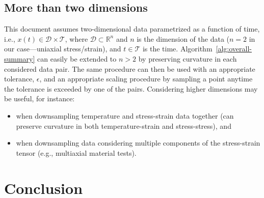 \documentclass[a4paper,11pt]{article}
\begin{document}
\subsection{More than two dimensions}

This document assumes two-dimensional data parametrized as a function of time, i.e., $x(t) \in \mathcal{D} \times \mathcal{T}$, where $\mathcal{D} \subset \mathbb{R}^n$ and $n$ is the dimension of the data ($n = 2$ in our case---uniaxial stress/strain), and $t \in \mathcal{T}$ is the time.
Algorithm~\ref{alg:overall-summary} can easily be extended to $n > 2$ by preserving curvature in each considered data pair.
The same procedure can then be used with an appropriate tolerance, $\epsilon$, and an appropriate scaling procedure by sampling a point anytime the tolerance is exceeded by one of the pairs.
Considering higher dimensions may be useful, for instance:
\begin{itemize}
    \item when downsampling temperature and stress-strain data together (can preserve curvature in both temperature-strain and stress-stress), and
    \item when downsampling data considering multiple components of the stress-strain tensor (e.g., multiaxial material tests).
\end{itemize}


\section{Conclusion}
\end{document}
